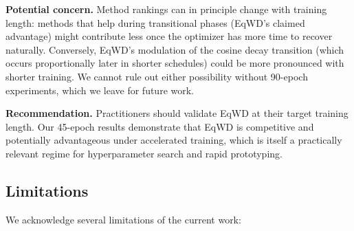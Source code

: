 \documentclass{article}
\begin{document}
\textbf{Potential concern.} Method rankings can in principle change with
training length: methods that help during transitional phases (EqWD's
claimed advantage) might contribute less once the optimizer has more
time to recover naturally. Conversely, EqWD's modulation of the cosine
decay transition (which occurs proportionally later in shorter
schedules) could be more pronounced with shorter training. We cannot
rule out either possibility without 90-epoch experiments, which we leave
for future work.

\textbf{Recommendation.} Practitioners should validate EqWD at their
target training length. Our 45-epoch results demonstrate that EqWD is
competitive and potentially advantageous under accelerated training,
which is itself a practically relevant regime for hyperparameter search
and rapid prototyping.

\subsection{Limitations}
\label{sec:limitations}

We acknowledge several limitations of the current work:
\end{document}
